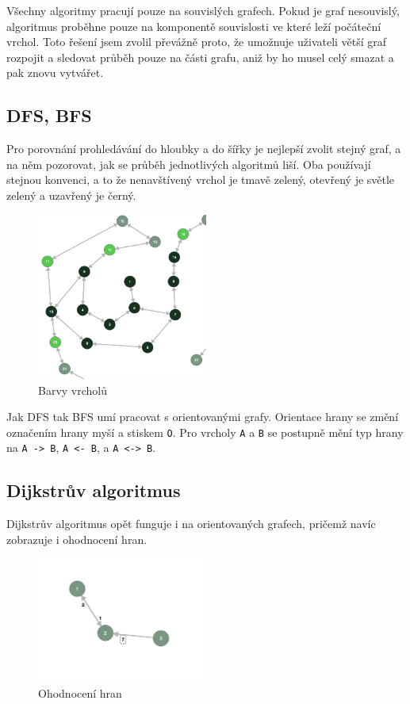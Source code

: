 \documentclass{article}
\def\code#1{\texttt{#1}}
\begin{document}
Všechny algoritmy pracují pouze na souvislých grafech. Pokud je graf nesouvislý,
algoritmus proběhne pouze na komponentě souvislosti ve které leží počáteční vrchol.
Toto řešení jsem zvolil převážně proto, že umožnuje uživateli větší graf rozpojit a sledovat
průběh pouze na části grafu, aniž by ho musel celý smazat a pak znovu vytvářet.

\subsection{DFS, BFS}

Pro porovnání prohledávání do hloubky a do šířky je nejlepší zvolit
stejný graf, a na něm pozorovat, jak se průběh jednotlivých algoritmů
liší. Oba používají stejnou konvenci, a to že nenavštívený vrchol je
tmavě zelený, otevřený je světle zelený a uzavřený je černý.

\begin{figure}[!h]
  \centering
    \includegraphics[width=0.5\textwidth]{CaAOrcu.png}
  \caption{Barvy vrcholů}
\end{figure}

Jak DFS tak BFS umí pracovat s orientovanými grafy. Orientace hrany se
změní označením hrany myší a stiskem \code{O}. Pro vrcholy \code{A} a \code{B} se
postupně mění typ hrany na \code{A -> B}, \code{A <- B}, a \code{A <-> B}.

\subsection{Dijkstrův algoritmus}

Dijkstrův algoritmus opět funguje i na orientovaných grafech, pričemž
navíc zobrazuje i ohodnocení hran.

\begin{figure}[!h]
  \centering
    \includegraphics[width=0.5\textwidth]{2d7DzOA.png}
  \caption{Ohodnocení hran}
\end{figure}
\end{document}
